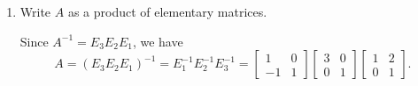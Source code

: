 \documentclass[12pt]{article}
\newcommand{\points}[1]{\marginpar{\hspace{24pt}[#1]}}
\begin{document}
\begin{enumerate}
\begin{enumerate}
\item Write $A$ as a product of elementary matrices. \points{2}


\bigskip

 Since $A^{-1}=E_3E_2E_1$, we have
\[
 A = (E_3E_2E_1)^{-1} = E_1^{-1}E_2^{-1}E_3^{-1} = \begin{bmatrix}1&0\\-1&1\end{bmatrix}\begin{bmatrix}3&0\\0&1\end{bmatrix}\begin{bmatrix}1&2\\0&1\end{bmatrix}.
\]


\bigskip

\end{enumerate}
\end{enumerate}
\end{document}
